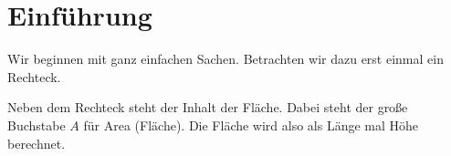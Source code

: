 \documentclass{article}
\begin{document}
\section*{Einführung}
Wir beginnen mit ganz einfachen Sachen. Betrachten wir dazu erst einmal ein Rechteck.
\begin{center}
\centering
{}
\end{center}
Neben dem Rechteck steht der Inhalt der Fläche. Dabei steht der große Buchstabe $A$ für Area (Fläche). Die Fläche wird also als Länge mal Höhe berechnet.
\end{document}
